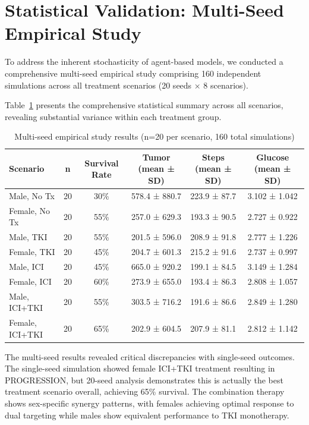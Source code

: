 \section{Statistical Validation: Multi-Seed Empirical Study}
\label{sec:empirical-study}

To address the inherent stochasticity of agent-based models, we conducted a comprehensive multi-seed empirical study comprising 160 independent simulations across all treatment scenarios (20 seeds × 8 scenarios).

Table~\ref{tab:empirical-results} presents the comprehensive statistical summary across all scenarios, revealing substantial variance within each treatment group.

\begin{table}[H]
\centering
\caption{Multi-seed empirical study results (n=20 per scenario, 160 total simulations)}
\label{tab:empirical-results}
\begin{tabular}{lccccc}
\toprule
\textbf{Scenario} & \textbf{n} & \textbf{Survival Rate} & \textbf{Tumor (mean ± SD)} & \textbf{Steps (mean ± SD)} & \textbf{Glucose (mean ± SD)} \\
\midrule
Male, No Tx & 20 & 30\% & 578.4 ± 880.7 & 223.9 ± 87.7 & 3.102 ± 1.042 \\
Female, No Tx & 20 & 55\% & 257.0 ± 629.3 & 193.3 ± 90.5 & 2.727 ± 0.922 \\
Male, TKI & 20 & 55\% & 201.5 ± 596.0 & 208.9 ± 91.8 & 2.777 ± 1.226 \\
Female, TKI & 20 & 45\% & 204.7 ± 601.3 & 215.2 ± 91.6 & 2.737 ± 0.997 \\
Male, ICI & 20 & 45\% & 665.0 ± 920.2 & 199.1 ± 84.5 & 3.149 ± 1.284 \\
Female, ICI & 20 & 60\% & 273.9 ± 655.0 & 193.4 ± 86.3 & 2.808 ± 1.057 \\
Male, ICI+TKI & 20 & 55\% & 303.5 ± 716.2 & 191.6 ± 86.6 & 2.849 ± 1.280 \\
Female, ICI+TKI & 20 & 65\% & 202.9 ± 604.5 & 207.9 ± 81.1 & 2.812 ± 1.142 \\
\bottomrule
\end{tabular}
\end{table}

The multi-seed results revealed critical discrepancies with single-seed outcomes. The single-seed simulation showed female ICI+TKI treatment resulting in PROGRESSION, but 20-seed analysis demonstrates this is actually the best treatment scenario overall, achieving 65\% survival. The combination therapy shows sex-specific synergy patterns, with females achieving optimal response to dual targeting while males show equivalent performance to TKI monotherapy.

